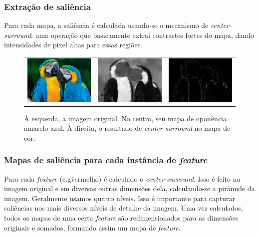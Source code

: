 \documentclass[11pt]{article}
\newcommand{\tit}[1]{\textit{#1}}
\begin{document}
\subsubsection{Extração de saliência}
Para cada mapa, a saliência é calculada usando-se o mecanismo de
\tit{center-surround}: uma operação que basicamente extrai contrastes fortes
do mapa, dando intensidades de pixel altas para essas regiões.
\begin{figure}[hbt]
\begin{center}
		\begin{tabular} {ccc}
            \includegraphics[width=0.3\linewidth]{img/arara.jpg} &
            \includegraphics[width=0.3\linewidth]{img/arara_y.png} &
            \includegraphics[width=0.3\linewidth]{img/arara_y_cs.png}
		\end{tabular}
\end{center}
\caption{À esquerda, a imagem original. No centro, seu mapa de oponência
amarelo-azul. À direita, o resultado de \tit{center-surround}
no mapa de cor.}
\label{fig:extrfeat}
\end{figure}

\subsubsection{Mapas de saliência para cada instância de \tit{feature}}
Para cada \tit{feature} (e.g\. vermelho) é calculado o
\tit{center-surround}.
Isso é feito na imagem original e em diversas outras dimensões dela,
calculando-se a pirâmide da imagem. Geralmente usamos quatro níveis.
Isso é importante para capturar saliências nos mais diversos níveis de detalhe
da imagem. Uma vez calculados, todos os mapas de uma certa \tit{feature}
são redimensionados para as dimensões originais e somados, formando assim
um mapa de \tit{feature}.
\end{document}

